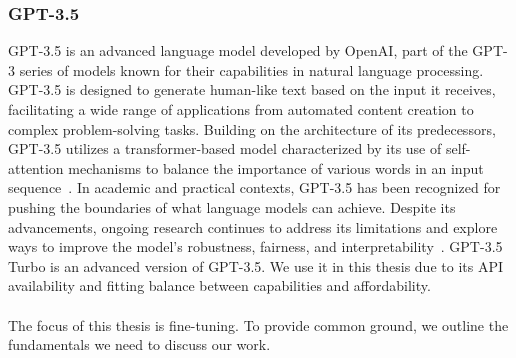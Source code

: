 \subsubsection*{GPT-3.5}\label{sec:gpt3.5}
GPT-3.5 is an advanced language model developed by OpenAI, part of the GPT-3 series of models known for their capabilities in natural language processing. GPT-3.5 is designed to generate human-like text based on the input it receives, facilitating a wide range of applications from automated content creation to complex problem-solving tasks. Building on the architecture of its predecessors, GPT-3.5 utilizes a transformer-based model characterized by its use of self-attention mechanisms to balance the importance of various words in an input sequence~\cite{latif_fine-tuning_2024}. 
In academic and practical contexts, GPT-3.5 has been recognized for pushing the boundaries of what language models can achieve. Despite its advancements, ongoing research continues to address its limitations and explore ways to improve the model's robustness, fairness, and interpretability~\cite {brown_language_2020}. GPT-3.5 Turbo is an advanced version of GPT-3.5. We use it in this thesis due to its API availability and fitting balance between capabilities and affordability.\\\\
The focus of this thesis is fine-tuning. To provide common ground, we outline the fundamentals we need to discuss our work.

